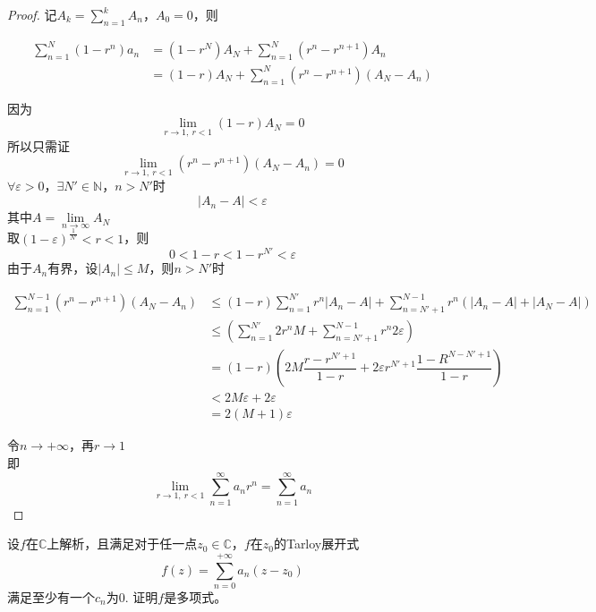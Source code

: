 \begin{proof}
    
    记$A_k = \sum\limits_{n = 1}^{k}{A_n}$，$A_0 = 0$，则

    \begin{align*}
        \sum\limits_{n = 1}^{N}{(1 - r^n)a_n} & = (1 - r^N)A_N + \sum\limits_{n = 1}^{N}{(r^n - r^{n + 1})A_n} \\
        & = (1 - r)A_N + \sum\limits_{n = 1}^{N}{(r^n - r^{n + 1})(A_N - A_n)}
    \end{align*}

    因为
    \[\lim\limits_{r \to 1, \ r < 1}{(1 - r)A_N} = 0\]
    所以只需证
    \[\lim\limits_{r \to 1, \ r < 1}{(r^n - r^{n + 1})(A_N - A_n)} = 0\]
    $\forall \varepsilon > 0 $，$\exists N' \in \mathbb{N}$，$n > N'$时
    \[|A_n - A| < \varepsilon \]
    其中$A = \lim\limits_{n \to \infty}{A_N}$ \\
    取$(1 - \varepsilon)^{\frac{1}{N'}} < r < 1$，则
    \[0 < 1 - r < 1 - r^{N'} < \varepsilon \]
    由于$A_n$有界，设$|A_n| \leq M $，则$n > N'$时
    
    \begin{align*}
        \sum\limits_{n = 1}^{N - 1}{(r^n - r^{n + 1})(A_N - A_n)} & \leq (1 - r)\sum\limits_{n = 1}^{N'}{r^n|A_n - A|} + \sum\limits_{n = N' + 1}^{N - 1}{r^n(|A_n - A| + |A_N - A|)} \\
        & \leq (\sum\limits_{n = 1}^{N'}{2r^nM} + \sum\limits_{n = N' + 1}^{N - 1}{r^n2\varepsilon}) \\
        & = (1 - r)\left( 2M\dfrac{r - r^{N' + 1}}{1 - r} + 2\varepsilon r^{N' + 1}\dfrac{1 - R^{N - N' + 1}}{1 - r} \right) \\
        & < 2M\varepsilon + 2\varepsilon \\
        & = 2(M + 1)\varepsilon
    \end{align*}

    令$n \to +\infty$，再$r \to 1$ \\
    即
    \[\lim\limits_{r \to 1, \ r < 1}{\sum\limits_{n = 1}^{\infty}{a_nr^n}} = \sum\limits_{n = 1}^{\infty}{a_n}\]

\end{proof}

\begin{proposition}
    
    设$f$在$\mathbb{C}$上解析，且满足对于任一点$z_0\in\mathbb{C}$，$f$在$z_0$的\textup{Tarloy}展开式
    \[f(z) = \sum\limits_{n = 0}^{+\infty}{a_n(z - z_0)}\]
    满足至少有一个$c_n$为$0$. 证明$f$是多项式。

\end{proposition}

